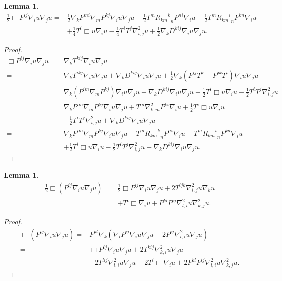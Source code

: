 \documentclass{amsart}
\newtheorem{lemma}[theorem]{Lemma}
\theoremstyle{definition}
\theoremstyle{remark}
\numberwithin{equation}{section}
\begin{document}
\begin{lemma}
\begin{align*}
\frac{1}{2}\Box P^{ij}\nabla_iu\nabla_ju=&\frac{1}{2}\nabla_kP^{mi}\nabla_mP^{kj}\nabla_iu\nabla_ju-\frac{1}{2}T^m{{R_{km}}^k}_nP^{ni}\nabla_iu-\frac{1}{2}T^m{{R_{km}}^i}_nP^{kn}\nabla_iu\\
&+\frac{1}{4}T^i\Box u\nabla_iu-\frac{1}{4}T^iT^j\nabla^2_{i,j}u+\frac{1}{2}\nabla_k D^{kij}\nabla_iu\nabla_ju.
\end{align*}
\end{lemma}
\begin{proof}
\begin{align*}
\Box P^{ij}\nabla_iu\nabla_ju=&\nabla_kT^{kij}\nabla_iu\nabla_ju\\
=&\nabla_kT^{ikj}\nabla_iu\nabla_ju+\nabla_k D^{kij}\nabla_iu\nabla_ju+\frac{1}{2}\nabla_k\left(P^{ij}T^k-P^{jk}T^i\right)\nabla_iu\nabla_ju\\
=&\nabla_k(P^{im}\nabla_mP^{kj})\nabla_iu\nabla_ju+\nabla_k D^{kij}\nabla_iu\nabla_ju+\frac{1}{2}T^i\Box u\nabla_iu-\frac{1}{2}T^iT^j\nabla^2_{i,j}u\\
=&\nabla_kP^{im}\nabla_mP^{kj}\nabla_iu\nabla_ju+T^m\nabla^2_{k,m}P^{ki}\nabla_iu+\frac{1}{2}T^i\Box u\nabla_iu\\
&-\frac{1}{2}T^iT^j\nabla^2_{i,j}u+\nabla_k D^{kij}\nabla_iu\nabla_ju\\
=&\nabla_kP^{im}\nabla_mP^{kj}\nabla_iu\nabla_ju-T^m{{R_{km}}^k}_nP^{ni}\nabla_iu-T^m{{R_{km}}^i}_nP^{kn}\nabla_iu\\
&+\frac{1}{2}T^i\Box u\nabla_iu-\frac{1}{2}T^iT^j\nabla^2_{i,j}u+\nabla_k D^{kij}\nabla_iu\nabla_ju.
\end{align*}
\end{proof}
\begin{lemma}
\begin{align*}
\frac{1}{2}\Box\left(P^{ij}\nabla_i u\nabla_ju\right)=&\frac{1}{2}\Box P^{ij}\nabla_i u\nabla_ju+2T^{ijk}\nabla^2_{i,j}u\nabla_ku\\
&+T^i\Box\nabla_i u+P^{kl}P^{ij}\nabla^2_{l,i}u\nabla^2_{k,j}u.
\end{align*}
\end{lemma}
\begin{proof}
\begin{align*}
\Box\left(P^{ij}\nabla_i u\nabla_ju\right)=&P^{kl}\nabla_k\left(\nabla_lP^{ij}\nabla_iu\nabla_ju+2P^{ij}\nabla^2_{l,i}u\nabla_ju\right)\\
=&\Box P^{ij}\nabla_i u\nabla_ju+2T^{kij}\nabla^2_{k,i}u\nabla_ju\\
&+2T^{lij}\nabla^2_{l,i}u\nabla_ju+2T^i\Box\nabla_i u+2P^{kl}P^{ij}\nabla^2_{l,i}u\nabla^2_{k,j}u.
\end{align*}
\end{proof}
\end{document}
